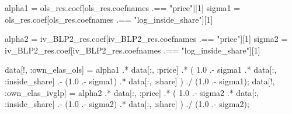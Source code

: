 \documentclass[
  letterpaper,
  DIV=11,
  numbers=noendperiod]{scrreprt}
\newenvironment{Shaded}{\begin{snugshade}}{\end{snugshade}}
\newcommand{\FloatTok}[1]{\textcolor[rgb]{0.68,0.00,0.00}{#1}}
\newcommand{\NormalTok}[1]{\textcolor[rgb]{0.00,0.23,0.31}{#1}}
\newcommand{\OperatorTok}[1]{\textcolor[rgb]{0.37,0.37,0.37}{#1}}
\newcommand{\StringTok}[1]{\textcolor[rgb]{0.13,0.47,0.30}{#1}}
\begin{document}
\begin{Shaded}
\begin{Highlighting}[]
\NormalTok{alpha1 }\OperatorTok{=}\NormalTok{ ols\_res.coef[ols\_res.coefnames }\OperatorTok{.==} \StringTok{"price"}\NormalTok{][}\FloatTok{1}\NormalTok{]}
\NormalTok{sigma1 }\OperatorTok{=}\NormalTok{ ols\_res.coef[ols\_res.coefnames }\OperatorTok{.==} \StringTok{"log\_inside\_share"}\NormalTok{][}\FloatTok{1}\NormalTok{]}

\NormalTok{alpha2 }\OperatorTok{=}\NormalTok{ iv\_BLP2\_res.coef[iv\_BLP2\_res.coefnames }\OperatorTok{.==} \StringTok{"price"}\NormalTok{][}\FloatTok{1}\NormalTok{]}
\NormalTok{sigma2 }\OperatorTok{=}\NormalTok{ iv\_BLP2\_res.coef[iv\_BLP2\_res.coefnames }\OperatorTok{.==} \StringTok{"log\_inside\_share"}\NormalTok{][}\FloatTok{1}\NormalTok{]}

\NormalTok{data[!, }\OperatorTok{:}\NormalTok{own\_elas\_ols] }\OperatorTok{=}\NormalTok{ alpha1 }\OperatorTok{.*}\NormalTok{ data[}\OperatorTok{:}\NormalTok{, }\OperatorTok{:}\NormalTok{price] }\OperatorTok{.*}\NormalTok{ (}
    \FloatTok{1.0} \OperatorTok{.{-}}\NormalTok{ sigma1 }\OperatorTok{.*}\NormalTok{ data[}\OperatorTok{:}\NormalTok{, }\OperatorTok{:}\NormalTok{inside\_share] }\OperatorTok{.{-}} 
\NormalTok{    (}\FloatTok{1.0} \OperatorTok{.{-}}\NormalTok{ sigma1) }\OperatorTok{.*}\NormalTok{ data[}\OperatorTok{:}\NormalTok{, }\OperatorTok{:}\NormalTok{share]}
\NormalTok{) }\OperatorTok{./}\NormalTok{ (}\FloatTok{1.0} \OperatorTok{.{-}}\NormalTok{ sigma1);}
\NormalTok{data[!, }\OperatorTok{:}\NormalTok{own\_elas\_ivglp] }\OperatorTok{=}\NormalTok{ alpha2 }\OperatorTok{.*}\NormalTok{ data[}\OperatorTok{:}\NormalTok{, }\OperatorTok{:}\NormalTok{price] }\OperatorTok{.*}\NormalTok{ (}
    \FloatTok{1.0} \OperatorTok{.{-}}\NormalTok{ sigma2 }\OperatorTok{.*}\NormalTok{ data[}\OperatorTok{:}\NormalTok{, }\OperatorTok{:}\NormalTok{inside\_share] }\OperatorTok{.{-}} 
\NormalTok{    (}\FloatTok{1.0} \OperatorTok{.{-}}\NormalTok{ sigma2) }\OperatorTok{.*}\NormalTok{ data[}\OperatorTok{:}\NormalTok{, }\OperatorTok{:}\NormalTok{share]}
\NormalTok{) }\OperatorTok{./}\NormalTok{ (}\FloatTok{1.0} \OperatorTok{.{-}}\NormalTok{ sigma2);}


\end{Highlighting}
\end{Shaded}
\end{document}
